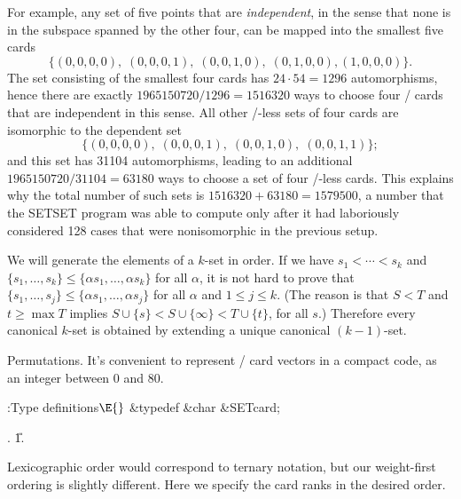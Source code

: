 For example, any set of five points that are {\it independent}, in the
sense that none is in the subspace spanned by the other four, can be
mapped into the smallest five cards
$$\{(0,0,0,0),\;(0,0,0,1),\;(0,0,1,0),\;(0,1,0,0),(1,0,0,0)\}.$$
The set consisting of the smallest four cards has $24\cdot54=1296$
automorphisms, hence there are exactly $1965150720/1296=1516320$ ways to
choose four \SET/ cards that are independent in this sense.
All other \SET/-less sets of four cards are isomorphic to the dependent set
$$\{(0,0,0,0),\;(0,0,0,1),\;(0,0,1,0),\;(0,0,1,1)\};$$
and this set has 31104 automorphisms, leading to an additional
$1965150720/31104=63180$ ways to choose a set of four \SET/-less cards.
This explains why the total number of such sets is $1516320+63180=1579500$,
a number that the {\mc SETSET} program was able to compute only after
it had laboriously considered 128 cases that were nonisomorphic
in the previous setup.

\fi

We will generate the elements of a $k$-set in order. If we have
$s_1<\cdots<s_k$ and $\{s_1,\ldots,s_k\}\le\{\alpha s_1,\ldots,\alpha s_k\}$
for all $\alpha$, it is not hard to prove that $\{s_1,\ldots,s_j\}\le\{\alpha
s_1,\ldots,\alpha s_j\}$ for all $\alpha$ and $1\le j\le k$.
(The reason is that $S<T$ and $t\ge\max T$ implies
$S\cup\{s\}<S\cup\{\infty\}<T\cup\{t\}$, for all $s$.)
Therefore every canonical $k$-set is obtained by extending a unique
canonical $(k-1)$-set.

\fi

Permutations.
It's convenient to represent \SET/ card vectors in a compact code,
as an integer between 0 and 80.

\Y\B\4:Type definitions\X${}\E{}$\6
\&{typedef} \&{char} \&{SETcard};\par
{}.
\U1.\fi

 Lexicographic order would correspond
to ternary notation, but our weight-first ordering is slightly different.
Here we specify the card ranks in the desired order.

